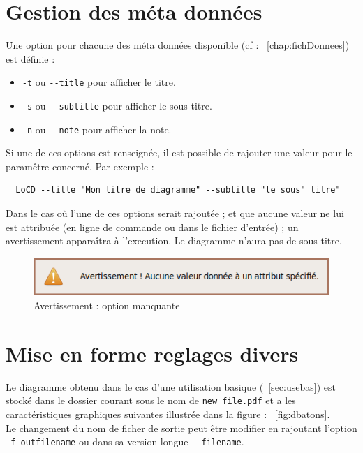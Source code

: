 \section{Gestion des méta données}
Une option pour chacune des méta données disponible (cf : ~\ref{chap:fichDonnees}) est définie :
\begin{itemize}
\item
\verb+-t+ ou \verb+--title+ pour afficher le titre.
\item
\verb+-s+ ou \verb+--subtitle+ pour afficher le sous titre.
\item
\verb+-n+ ou \verb+--note+ pour afficher la note.
\end{itemize}
Si une de ces options est renseignée, il est possible de rajouter une valeur pour le paramêtre concerné. Par exemple : 
\begin{verbatim}
  LoCD --title "Mon titre de diagramme" --subtitle "le sous" titre"
\end{verbatim} 
Dans le cas où l'une de ces options serait rajoutée ; et que aucune valeur ne lui est attribuée (en ligne de commande ou dans le fichier d'entrée) ; un avertissement apparaîtra à l'execution. Le diagramme n'aura pas de sous titre.
  \begin{figure}[htbp]
    \centering
    \includegraphics[scale=0.90]{img/aattributs}
    \caption{Avertissement : option manquante}
    \label{fig:optmissing}
  \end{figure}  


\section{Mise en forme reglages divers}
Le diagramme obtenu dans le cas d'une utilisation basique (~\ref{sec:usebas}) est stocké dans le dossier courant sous le nom de \verb+new_file.pdf+ et a les caractéristiques graphiques suivantes illustrée dans la figure :  ~\ref{fig:dbatons}.\\ Le changement du nom de ficher de sortie peut être modifier en rajoutant l'option \verb+-f outfilename+ ou dans sa version longue \verb+--filename+. 
